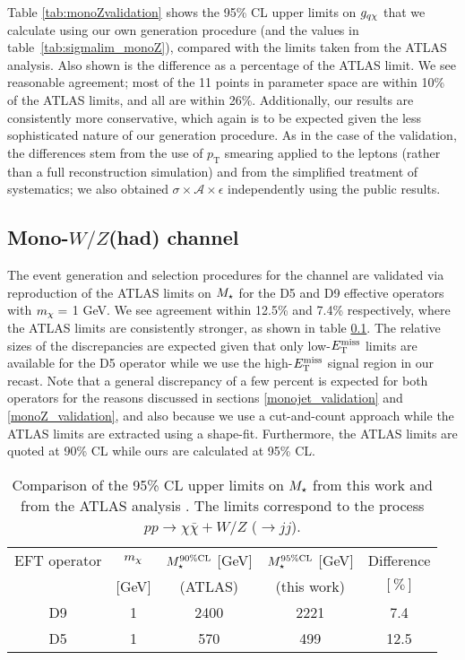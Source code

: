 Table \ref{tab:monoZvalidation} shows the 95\% CL upper limits on $g_{q \chi}$ that we calculate using our own generation procedure (and the values in table~\ref{tab:sigmalim_monoZ}), compared with the limits taken from the ATLAS analysis. Also shown is the difference as a percentage of the ATLAS limit. We see reasonable agreement; most of the 11 points in parameter space are within 10\% of the ATLAS limits, and all are within 26\%. Additionally, our results are consistently more conservative, which again is to be expected given the less sophisticated nature of our generation procedure. As in the case of the \monojet validation, the differences stem from the use of $p_{\mathrm{T}}$ smearing applied to the leptons (rather than a full reconstruction simulation) and from the simplified treatment of systematics; we also obtained $\sigma \times \mathcal{A} \times \epsilon$ independently using the public results.

\subsection{Mono-$W/Z$(had) channel}
\label{monoWZ_validation}

The event generation and selection procedures for the \monoWZ channel are validated via reproduction of the ATLAS limits on $M_{\star}$ for the D5 and D9 effective operators with $m_{\chi} = $ 1 GeV. We see agreement within 12.5\% and 7.4\% respectively, where the ATLAS limits are consistently stronger, as shown in table \ref{monoWZ_validation}. The relative sizes of the discrepancies are expected given that only low-$E_{\mathrm{T}}^{\mathrm{miss}}$ limits are available for the D5 operator while we use the high-$E_{\mathrm{T}}^{\mathrm{miss}}$ signal region in our recast. Note that a general discrepancy of a few percent is expected for both operators for the reasons discussed in sections \ref{monojet_validation} and \ref{monoZ_validation}, and also because we use a cut-and-count approach while the ATLAS limits are extracted using a shape-fit. Furthermore, the ATLAS limits are quoted at 90\% CL while ours are calculated at 95\% CL.

\begin{table}[!h]
\begin{center}
\begin{tabular}{ c | c | c | c | c }
\hline
\hline
EFT operator & $m_{\chi}$ & $M_{\star}^{90\%\mathrm{CL}}$ $[$GeV$]$ & $M_{\star}^{95\%\mathrm{CL}}$ $[$GeV$]$  & Difference \T \\
&$[$GeV$]$ & (ATLAS) & (this work) & $[\%]$ \B \\
\hline
D9 & 1 & 2400 & 2221 & 7.4 \\
D5 & 1 & 570 & 499 & 12.5 \\
\hline
\hline
\end{tabular}
\end{center}
\caption{Comparison of the 95\% CL upper limits on $M_{\star}$ from this work and from the ATLAS \monoWZ analysis \cite{Aad:2013monoWZ}. The limits correspond to the process $pp \rightarrow \chi \bar{\chi} + W/Z$ ($\rightarrow jj$).}
\label{tab:monoWZvalidation}
\end{table}
